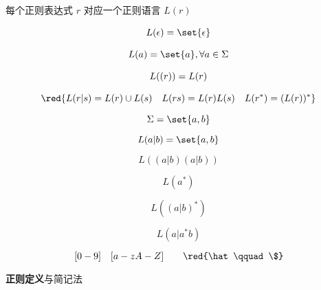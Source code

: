 \begin{frame}{}
  \begin{center}
    每个正则表达式 $r$ 对应一个正则语言 $L(r)$
  \end{center}

  \begin{definition}[正则表达式对应的正则语言]
    \begin{gather}
      L(\epsilon) = \set{\epsilon} \\[8pt]
      L(a) = \set{a}, \forall a \in \Sigma \\[8pt]
      L((r)) = L(r) \\[8pt]
      \red{L(r|s) = L(r) \cup L(s) \quad L(rs) = L(r)L(s)
      \quad L(r^{\ast}) = (L(r))^{\ast}}
    \end{gather}
  \end{definition}
\end{frame}

\begin{frame}{}
  \[
    \Sigma = \set{a, b}
  \]

  \[
    L(a | b) = \set{a, b}
  \]

  \pause
  \[
    L((a | b) (a | b))
  \]

  \pause
  \[
    L(a^{\ast})
  \]

  \pause
  \[
    L((a | b)^{\ast})
  \]

  \pause
  \[
    L(a | a^{\ast}b)
  \]
\end{frame}

\begin{frame}{}
\end{frame}

\begin{frame}{}
  \pause
  \[
    [0-9] \quad [a-zA-Z] \qquad \red{\hat\qquad \$}
  \]
\end{frame}

\begin{frame}{}
  \begin{center}
    {\bf 正则定义}与简记法
  \end{center}

\end{frame}


